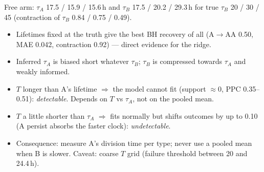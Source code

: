 \documentclass[10pt,a4paper]{article}
\newcommand{\tA}{$\tau_A$}
\newcommand{\tB}{$\tau_B$}
\newcommand{\blk}[1]{\par\needspace{5\baselineskip}\smallskip{\sffamily\bfseries\color{inkgray}#1}\par}
\newcommand{\Comment}{\blk{Comment}}
\begin{document}
Free arm: \tA{} 17.5 / 15.9 / 15.6\,h and \tB{} 17.5 / 20.2 / 29.3\,h for true \tB{} 20 / 30 / 45 (contraction of \tB{} 0.84 / 0.75 / 0.49).
\Comment
\begin{itemize}
\item Lifetimes fixed at the truth give the best BH recovery of all (A$\to$AA 0.50, MAE 0.042, contraction 0.92) --- direct evidence for the ridge.
\item Inferred \tA{} is biased short whatever \tB; \tB{} is compressed towards \tA{} and weakly informed.
\item $T$ longer than A's lifetime $\Rightarrow$ the model cannot fit (support $\approx 0$, PPC 0.35--0.51): \emph{detectable}. Depends on $T$ vs \tA, not on the pooled mean.
\item $T$ a little shorter than \tA{} $\Rightarrow$ fits normally but shifts outcomes by up to 0.10 (A persist absorbs the faster clock): \emph{undetectable}.
\item Consequence: measure A's division time per type; never use a pooled mean when B is slower. Caveat: coarse $T$ grid (failure threshold between 20 and 24.4\,h).
\end{itemize}

\end{document}

